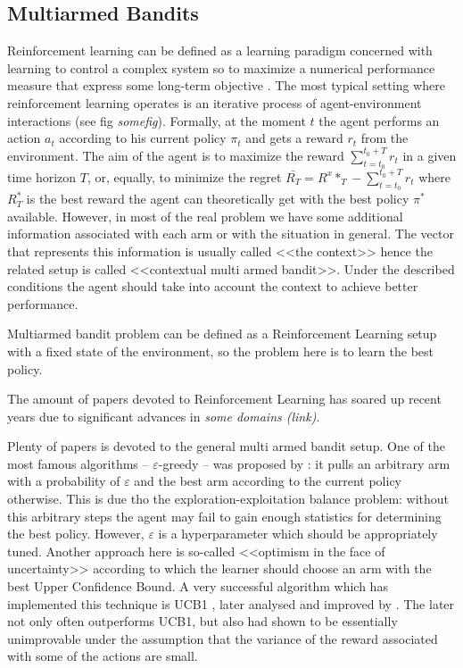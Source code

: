 \documentclass[a4paper]{article}
\begin{document}
\subsection{Multiarmed Bandits}
Reinforcement learning can be defined as a learning paradigm concerned with learning to control a complex system so to maximize a numerical performance measure that express some long-term objective \cite{Szepesvari2010}. The most typical setting where reinforcement learning operates is an iterative process of agent-environment interactions (see fig \textit{somefig}). Formally, at the moment $t$ the agent performs an action $a_t$ according to his current policy $\pi_t$ and gets a reward $r_t$ from the environment. The aim of the agent is to maximize the reward $\sum_{t = t_0}^{t_0 + T}r_t$ in a given time horizon $T$, or, equally, to minimize the regret $\bar{R_T} = R^x*_T - \sum_{t = t_0}^{t_0 + T}r_t$ where $R^*_T$ is the best reward the agent can theoretically get with the best policy $\pi^*$ available. However, in most of the real problem we have some additional information associated with each arm or with the situation in general. The vector that represents this information is usually called <<the context>> hence the related setup is called <<contextual multi armed bandit>>. Under the described conditions the agent should take into account the context to achieve better performance. 
 
Multiarmed bandit problem can be defined as a Reinforcement Learning setup with a fixed state of the environment, so the problem here is to learn the best policy. 

The amount of papers devoted to Reinforcement Learning has soared up recent years due to significant advances in \textit{some domains (link)}.

Plenty of papers is devoted to the general multi armed bandit setup. One of the most famous algorithms -- $\varepsilon$-greedy -- was proposed by \cite{Auer2002}: it pulls an arbitrary arm with a probability of $\varepsilon$ and the best arm according to the current policy otherwise. This is due tho the exploration-exploitation balance problem: without this arbitrary steps the agent may fail to gain enough statistics for determining the best policy. However, $\varepsilon$ is a hyperparameter which should be appropriately tuned. Another approach here is so-called <<optimism in the face of uncertainty>> \cite{Lai1985} according to which the learner should choose an arm with the best Upper Confidence Bound. A very successful algorithm which has implemented this technique is UCB1 \cite{Auer2002}, later analysed and improved by \cite{Audibert2009}. The later not only often outperforms UCB1, but also had shown to be essentially unimprovable under the assumption that the variance of the reward associated with some of the actions are small.
\end{document}
